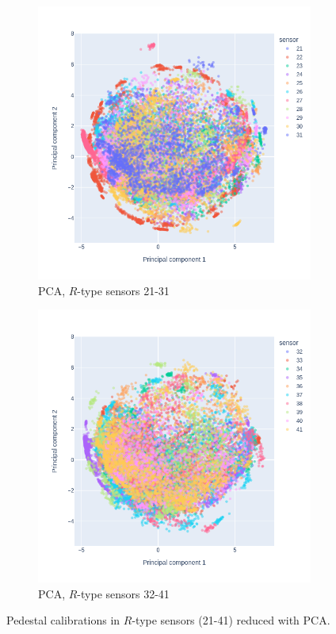 \begin{figure}
\centering
  \begin{subfigure}[b]{0.7\textwidth}
    \centering
    \includegraphics[width=\linewidth]{figures/chapter4/dimred/PCA_pedestals_r_phi_2.png}
    \caption{PCA, $R$-type sensors 21-31}
    \label{plot:PCA_pedestals_2}
  \end{subfigure}
  \begin{subfigure}[b]{0.7\textwidth}
    \centering
    \includegraphics[width=\linewidth]{figures/chapter4/dimred/PCA_pedestals_r_phi_3.png}
    \caption{PCA, $R$-type sensors 32-41}
    \label{plot:PCA_pedestals_3}
  \end{subfigure}

\caption[All calibrationb]{Pedestal calibrations in $R$-type sensors (21-41) reduced with PCA.}
\label{plot:pca_all_pedb}
\end{figure}
